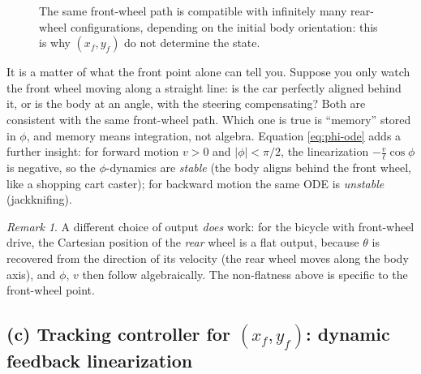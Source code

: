 \documentclass[11pt,a4paper]{article}
\theoremstyle{definition}
\theoremstyle{plain}
\theoremstyle{remark}
\newtheorem*{remark}{Remark}
\begin{document}
\begin{figure}[H]
\centering
{}
\caption{The same front-wheel path is compatible with infinitely many rear-wheel configurations, depending on the initial body orientation: this is why $(x_f,y_f)$ do not determine the state.}
\end{figure}

\begin{intuition}
It is a matter of what the front point alone can tell you. Suppose you only watch the front wheel moving along a straight line: is the car perfectly aligned behind it, or is the body at an angle, with the steering compensating? Both are consistent with the same front-wheel path. Which one is true is ``memory'' stored in $\phi$, and memory means integration, not algebra. Equation \eqref{eq:phi-ode} adds a further insight: for forward motion $v>0$ and $|\phi|<\pi/2$, the linearization $-\frac{v}{\ell}\cos\phi$ is negative, so the $\phi$-dynamics are \emph{stable} (the body aligns behind the front wheel, like a shopping cart caster); for backward motion the same ODE is \emph{unstable} (jackknifing).
\end{intuition}

\begin{remark}
A different choice of output \emph{does} work: for the bicycle with front-wheel drive, the Cartesian position of the \emph{rear} wheel is a flat output, because $\theta$ is recovered from the direction of its velocity (the rear wheel moves along the body axis), and $\phi$, $v$ then follow algebraically. The non-flatness above is specific to the front-wheel point.
\end{remark}

\subsection{(c) Tracking controller for $(x_f,y_f)$: dynamic feedback linearization}
\end{document}
